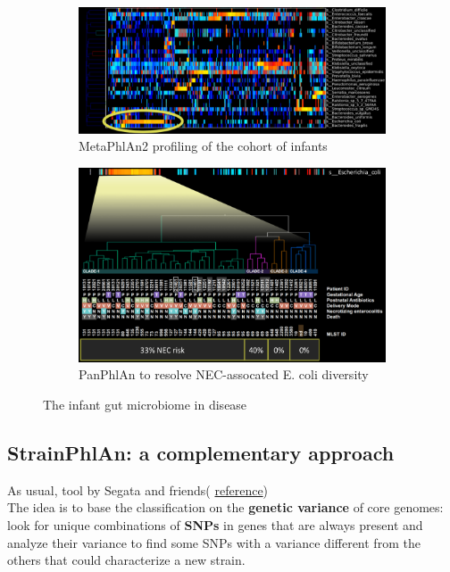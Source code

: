 \begin{figure}[!h]
\centering
\begin{subfigure}{.45\textwidth}
    \centering
    \includegraphics[width=\linewidth]{nec1.png}
    \caption{\label{fig:nec1}MetaPhlAn2 profiling of the cohort of infants}
\end{subfigure}
%
\begin{subfigure}{.45\textwidth}
    \centering
    \includegraphics[width=\linewidth]{nec2.png}
    \caption{\label{fig:nec2}PanPhlAn to resolve NEC-assocated E. coli diversity}
\end{subfigure}
\caption{The infant gut microbiome in disease}
\end{figure}

\subsection{StrainPhlAn: a complementary approach}

As usual, tool by Segata and friends( \href{http://segatalab.cibio.unitn.it/tools/strainphlan/index.html}{reference}) \\

The idea is to base the classification on the \textbf{genetic variance} of core genomes: look for unique combinations of \textbf{SNPs} in genes that are always present and analyze their variance to find some SNPs with a variance different from the others that could characterize a new strain.

